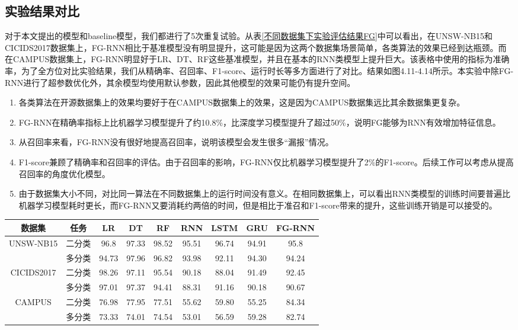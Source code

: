 \subsection{实验结果对比}
对于本文提出的模型和baseline模型，我们都进行了5次重复试验。从表\ref{不同数据集下实验评估结果FG}中可以看出，在UNSW-NB15和CICIDS2017数据集上，FG-RNN相比于基准模型没有明显提升，这可能是因为这两个数据集场景简单，各类算法的效果已经到达瓶颈。而在CAMPUS数据集上，FG-RNN明显好于LR、DT、RF这些基准模型，并且在基本的RNN类模型上提升巨大。该表格中使用的指标为准确率，为了全方位对比实验结果，我们从精确率、召回率、F1-score、运行时长等多方面进行了对比。结果如图4.11-4.14所示。本实验中除FG-RNN进行了超参数优化外，其余模型均使用默认参数，因此其他模型的效果可能仍有提升空间。
\begin{enumerate}
  \item 各类算法在开源数据集上的效果均要好于在CAMPUS数据集上的效果，这是因为CAMPUS数据集远比其余数据集更复杂。
  \item FG-RNN在精确率指标上比机器学习模型提升了约10.8\%，比深度学习模型提升了超过50\%，说明FG能够为RNN有效增加特征信息。
  \item 从召回率来看，FG-RNN没有很好地提高召回率，说明该模型会发生很多“漏报”情况。
  \item F1-score兼顾了精确率和召回率的评估。由于召回率的影响，FG-RNN仅比机器学习模型提升了2\%的F1-score。后续工作可以考虑从提高召回率的角度优化模型。
  \item 由于数据集大小不同，对比同一算法在不同数据集上的运行时间没有意义。在相同数据集上，可以看出RNN类模型的训练时间要普遍比机器学习模型耗时更长，而FG-RNN又要消耗约两倍的时间，但是相比于准召和F1-score带来的提升，这些训练开销是可以接受的。
\end{enumerate}
\begin{table*}[h]
  \small
  \caption{不同数据集下实验评估结果(\%)}
  \label{不同数据集下实验评估结果FG}
  \centering
  \begin{tabular}{c|c|ccc|ccc|c}
  \toprule
  
    数据集 &  任务  &  
    LR &  DT & RF & RNN & LSTM & GRU & FG-RNN  \\
  \midrule
  
  UNSW-NB15 & 二分类 & 96.8 & 97.33 & 98.52 &  95.51 & 96.74 & 94.91 & 95.8 \\ 
  
  & 多分类 &94.73 & 97.96 & 96.82 & 93.98 & 92.11 & 94.30 & 94.24 \\
  
  \midrule
  CICIDS2017 & 二分类 & 98.26 & 97.11 & 95.54 & 90.18 & 88.04 & 91.49 & 92.45 \\
  & 多分类 & 97.01 & 97.37 & 94.41 & 88.31 & 91.16 & 90.18 & 90.67\\
  \midrule
  CAMPUS & 二分类 & 76.98 & 77.95 & 77.51 & 55.62 & 59.80 & 55.25 & 84.34 \\
  & 多分类 & 73.33 & 74.01 & 74.54 & 53.01 & 56.59 & 59.28 & 82.74\\
  
    \bottomrule
  
  \end{tabular}
  \end{table*}

